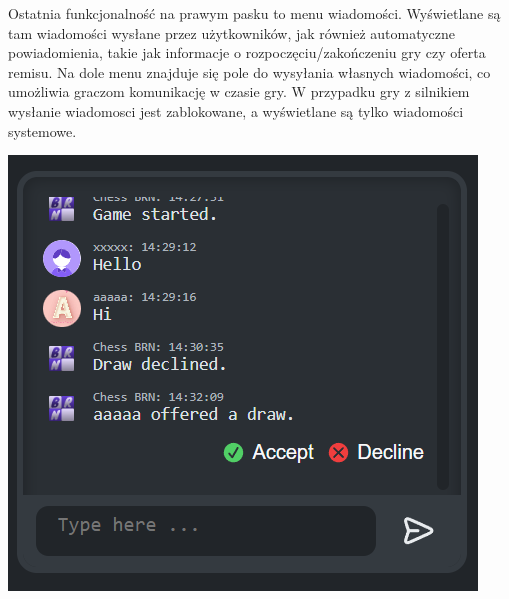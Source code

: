 \documentclass[twoside]{projektInzynierskiMS1}
\begin{document}
\noindent
\begin{minipage}[t]{0.45\textwidth} 
    \vspace{0pt} 
    \justifying 
    \noindent 
    Ostatnia funkcjonalność na prawym pasku to menu wiadomości. Wyświetlane są tam wiadomości wysłane przez użytkowników, jak również automatyczne powiadomienia, takie jak informacje o rozpoczęciu/zakończeniu gry czy oferta remisu. Na dole menu znajduje się pole do wysyłania własnych wiadomości, co umożliwia graczom komunikację w czasie gry. W przypadku gry z silnikiem wysłanie wiadomosci jest zablokowane, a wyświetlane są tylko wiadomości systemowe.
\end{minipage} 
\hfill 
\begin{minipage}[t]{0.45\textwidth} 
    \vspace{0pt} 
    \centering 
    \includegraphics[width=\linewidth]{images/ins_min_mess.png} 
\end{minipage}

\newpage
\end{document}
